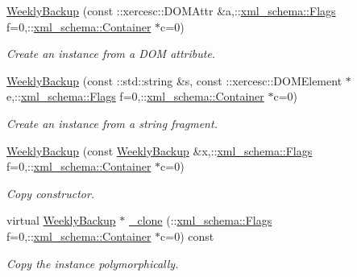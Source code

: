 \begin{DoxyCompactItemize}
\hyperlink{classopenstack_1_1xml_1_1WeeklyBackup_a0ac7b52cb8f24035cac030bbe6fc4012}{WeeklyBackup} (const ::xercesc::DOMAttr \&a,::\hyperlink{namespacexml__schema_affb4c227cbd9aa7453dd1dc5a1401943}{xml\_\-schema::Flags} f=0,::\hyperlink{namespacexml__schema_a333dea2213742aea47a37532dec4ec27}{xml\_\-schema::Container} $\ast$c=0)
\begin{DoxyCompactList}\small\item\em Create an instance from a DOM attribute. \item\end{DoxyCompactList}\item 
\hyperlink{classopenstack_1_1xml_1_1WeeklyBackup_a7198a6ab897eacf6581e439083233580}{WeeklyBackup} (const ::std::string \&s, const ::xercesc::DOMElement $\ast$e,::\hyperlink{namespacexml__schema_affb4c227cbd9aa7453dd1dc5a1401943}{xml\_\-schema::Flags} f=0,::\hyperlink{namespacexml__schema_a333dea2213742aea47a37532dec4ec27}{xml\_\-schema::Container} $\ast$c=0)
\begin{DoxyCompactList}\small\item\em Create an instance from a string fragment. \item\end{DoxyCompactList}\item 
\hyperlink{classopenstack_1_1xml_1_1WeeklyBackup_a9aa5c16d8164e04172404b2b961ba527}{WeeklyBackup} (const \hyperlink{classopenstack_1_1xml_1_1WeeklyBackup}{WeeklyBackup} \&x,::\hyperlink{namespacexml__schema_affb4c227cbd9aa7453dd1dc5a1401943}{xml\_\-schema::Flags} f=0,::\hyperlink{namespacexml__schema_a333dea2213742aea47a37532dec4ec27}{xml\_\-schema::Container} $\ast$c=0)
\begin{DoxyCompactList}\small\item\em Copy constructor. \item\end{DoxyCompactList}\item 
virtual \hyperlink{classopenstack_1_1xml_1_1WeeklyBackup}{WeeklyBackup} $\ast$ \hyperlink{classopenstack_1_1xml_1_1WeeklyBackup_a6bbf9d0e3d930979a721672d96c85bf7}{\_\-clone} (::\hyperlink{namespacexml__schema_affb4c227cbd9aa7453dd1dc5a1401943}{xml\_\-schema::Flags} f=0,::\hyperlink{namespacexml__schema_a333dea2213742aea47a37532dec4ec27}{xml\_\-schema::Container} $\ast$c=0) const 
\begin{DoxyCompactList}\small\item\em Copy the instance polymorphically. \item\end{DoxyCompactList}\item 

\end{DoxyCompactItemize}
